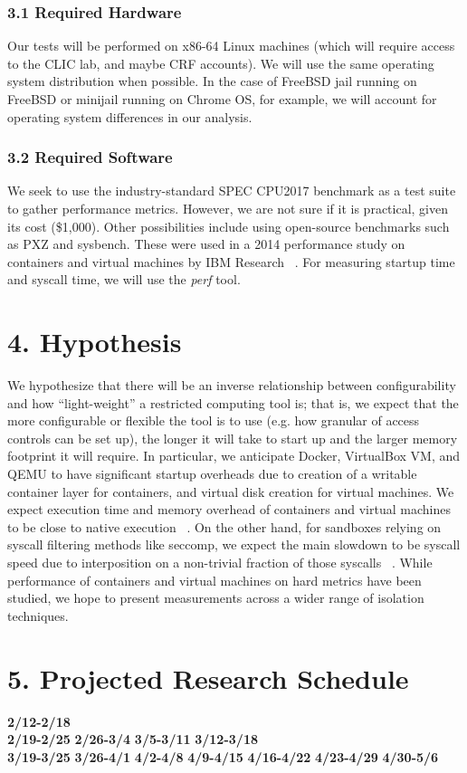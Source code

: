 \documentclass{proc}
\begin{document}
\subsubsection*{3.1 Required Hardware}
Our tests will be performed on x86-64 Linux machines (which will require access to the CLIC lab, and maybe CRF accounts). We will use the same operating system distribution when possible. In the case of FreeBSD jail running on FreeBSD or minijail running on Chrome OS, for example, we will account for operating system differences in our analysis.
\subsubsection*{3.2 Required Software}
We seek to use the industry-standard SPEC CPU2017 benchmark \cite{limaye2018spec} as a test suite to gather performance metrics. However, we are not sure if it is practical, given its cost (\$1,000). Other possibilities include using open-source benchmarks such as PXZ and sysbench. These were used in a 2014 performance study on containers and virtual machines by IBM Research ~\cite{felter2014docker}. For measuring startup time and syscall time, we will use the \emph{perf} tool.
\section*{4. Hypothesis}
We hypothesize that there will be an inverse relationship between configurability and how ``light-weight'' a restricted computing tool is; that is, we expect that the more configurable or flexible the tool is to use (e.g. how granular of access controls can be set up), the longer it will take to start up and the larger memory footprint it will require. In particular, we anticipate Docker, VirtualBox VM, and QEMU to have significant startup overheads due to creation of a writable container layer for containers, and virtual disk creation for virtual machines. We expect execution time and memory overhead of containers and virtual machines to be close to native execution ~\cite{felter2014docker}. On the other hand, for sandboxes relying on syscall filtering methods like seccomp, we expect the main slowdown to be syscall speed due to interposition on a non-trivial fraction of those syscalls ~\cite{kim2013mbox}. While performance of containers and virtual machines on hard metrics have been studied, we hope to present measurements across a wider range of isolation techniques.
\section*{5. Projected Research Schedule}
\textbf{2/12-2/18} \\
\textbf{2/19-2/25}
\textbf{2/26-3/4}
\textbf{3/5-3/11}
\textbf{3/12-3/18} \\
\textbf{3/19-3/25}
\textbf{3/26-4/1}
\textbf{4/2-4/8}
\textbf{4/9-4/15}
\textbf{4/16-4/22}
\textbf{4/23-4/29}
\textbf{4/30-5/6}






\end{document}
